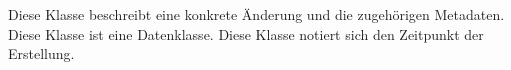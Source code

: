 Diese Klasse beschreibt eine konkrete Änderung und die zugehörigen Metadaten.
Diese Klasse ist eine Datenklasse.
Diese Klasse notiert sich den Zeitpunkt der Erstellung.